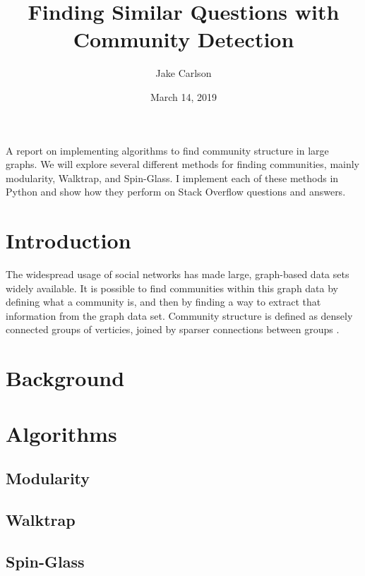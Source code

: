 \documentclass{article}
\begin{document}
\title{Finding Similar Questions with Community Detection}
\author{Jake Carlson}
\date{March 14, 2019}
\maketitle

\abstract
A report on implementing algorithms to find community structure in large graphs. We will explore several different methods for finding communities, mainly modularity, Walktrap, and Spin-Glass. I implement each of these methods in Python and show how they perform on Stack Overflow questions and answers.
\newpage

\tableofcontents
\newpage

\section{Introduction}
The widespread usage of social networks has made large, graph-based data sets widely available. It is possible to find communities within this graph data by defining what a community is, and then by finding a way to extract that information from the graph data set. Community structure is defined as densely connected groups of verticies, joined by sparser connections between groups \cite{newman}.

\section{Background}

\section{Algorithms}

    \subsection{Modularity}

    \subsection{Walktrap}

    \subsection{Spin-Glass}
\end{document}
